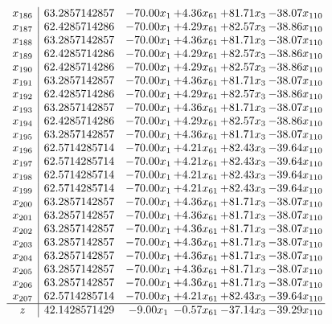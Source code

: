 \documentclass[8pt]{article}
\begin{document}
\[\begin{array}{c| c c@{\hskip 2pt} c@{\hskip 2pt} c@{\hskip 2pt} c@{\hskip 2pt} }
 x_{186}   &  63.2857142857 & -70.00 x_{1} & +  4.36 x_{61} & + 81.71 x_{3} & -38.07 x_{110}\\
 x_{187}   &  62.4285714286 & -70.00 x_{1} & +  4.29 x_{61} & + 82.57 x_{3} & -38.86 x_{110}\\
 x_{188}   &  63.2857142857 & -70.00 x_{1} & +  4.36 x_{61} & + 81.71 x_{3} & -38.07 x_{110}\\
 x_{189}   &  62.4285714286 & -70.00 x_{1} & +  4.29 x_{61} & + 82.57 x_{3} & -38.86 x_{110}\\
 x_{190}   &  62.4285714286 & -70.00 x_{1} & +  4.29 x_{61} & + 82.57 x_{3} & -38.86 x_{110}\\
 x_{191}   &  63.2857142857 & -70.00 x_{1} & +  4.36 x_{61} & + 81.71 x_{3} & -38.07 x_{110}\\
 x_{192}   &  62.4285714286 & -70.00 x_{1} & +  4.29 x_{61} & + 82.57 x_{3} & -38.86 x_{110}\\
 x_{193}   &  63.2857142857 & -70.00 x_{1} & +  4.36 x_{61} & + 81.71 x_{3} & -38.07 x_{110}\\
 x_{194}   &  62.4285714286 & -70.00 x_{1} & +  4.29 x_{61} & + 82.57 x_{3} & -38.86 x_{110}\\
 x_{195}   &  63.2857142857 & -70.00 x_{1} & +  4.36 x_{61} & + 81.71 x_{3} & -38.07 x_{110}\\
 x_{196}   &  62.5714285714 & -70.00 x_{1} & +  4.21 x_{61} & + 82.43 x_{3} & -39.64 x_{110}\\
 x_{197}   &  62.5714285714 & -70.00 x_{1} & +  4.21 x_{61} & + 82.43 x_{3} & -39.64 x_{110}\\
 x_{198}   &  62.5714285714 & -70.00 x_{1} & +  4.21 x_{61} & + 82.43 x_{3} & -39.64 x_{110}\\
 x_{199}   &  62.5714285714 & -70.00 x_{1} & +  4.21 x_{61} & + 82.43 x_{3} & -39.64 x_{110}\\
 x_{200}   &  63.2857142857 & -70.00 x_{1} & +  4.36 x_{61} & + 81.71 x_{3} & -38.07 x_{110}\\
 x_{201}   &  63.2857142857 & -70.00 x_{1} & +  4.36 x_{61} & + 81.71 x_{3} & -38.07 x_{110}\\
 x_{202}   &  63.2857142857 & -70.00 x_{1} & +  4.36 x_{61} & + 81.71 x_{3} & -38.07 x_{110}\\
 x_{203}   &  63.2857142857 & -70.00 x_{1} & +  4.36 x_{61} & + 81.71 x_{3} & -38.07 x_{110}\\
 x_{204}   &  63.2857142857 & -70.00 x_{1} & +  4.36 x_{61} & + 81.71 x_{3} & -38.07 x_{110}\\
 x_{205}   &  63.2857142857 & -70.00 x_{1} & +  4.36 x_{61} & + 81.71 x_{3} & -38.07 x_{110}\\
 x_{206}   &  63.2857142857 & -70.00 x_{1} & +  4.36 x_{61} & + 81.71 x_{3} & -38.07 x_{110}\\
 x_{207}   &  62.5714285714 & -70.00 x_{1} & +  4.21 x_{61} & + 82.43 x_{3} & -39.64 x_{110}\\
\hline
z    &  42.1428571429 & -9.00 x_{1} & -0.57 x_{61} & -37.14 x_{3} & -39.29 x_{110}\\
\end{array}\]
\end{document}
